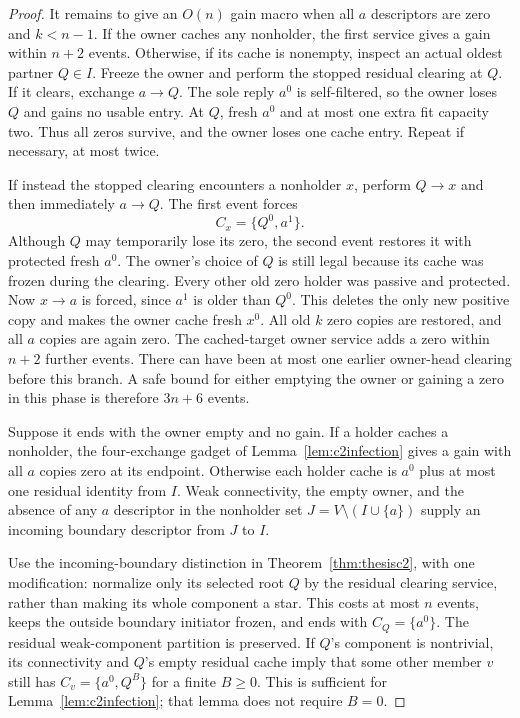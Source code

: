 \documentclass[11pt]{article}
\begin{document}
\begin{proof}
It remains to give an $O(n)$ gain macro when all $a$
descriptors are zero and $k<n-1$. If the owner caches any nonholder, the first service
gives a gain within $n+2$ events. Otherwise, if its cache
is nonempty, inspect an actual oldest partner $Q\in I$.
Freeze the owner and perform the stopped
residual clearing at $Q$. If it clears, exchange
$a\to Q$. The sole reply $a^0$ is self-filtered,
so the owner loses $Q$ and gains no usable entry.
At $Q$, fresh $a^0$ and at most one extra fit capacity
two. Thus all zeros survive, and the owner loses
one cache entry. Repeat if necessary, at most twice.

If instead the stopped clearing encounters a nonholder
$x$, perform $Q\to x$ and then immediately $a\to Q$.
The first event forces
\[
 C_x=\{Q^0,a^1\}.
\]
Although $Q$ may temporarily lose its zero, the second
event restores it with protected fresh $a^0$.
The owner's choice of $Q$ is still legal because
its cache was frozen during the clearing.
Every other old zero holder was passive and protected.
Now $x\to a$ is forced, since $a^1$ is older than $Q^0$.
This deletes the only new positive copy and makes the
owner cache fresh $x^0$. All old $k$ zero copies are
restored, and all $a$ copies are again zero.
The cached-target owner service adds a zero within
$n+2$ further events. There can have been at most one
earlier owner-head clearing before this branch.
A safe bound for either emptying the owner or gaining
a zero in this phase is therefore $3n+6$ events.

Suppose it ends with the owner empty and no gain.
If a holder caches a nonholder, the four-exchange
gadget of Lemma~\ref{lem:c2infection} gives a gain
with all $a$ copies zero at its endpoint.
Otherwise each holder cache is $a^0$ plus at most
one residual identity from $I$. Weak connectivity,
the empty owner, and the absence of any $a$ descriptor
in the nonholder set
$J=V\setminus(I\cup\{a\})$
supply an incoming boundary descriptor from $J$ to $I$.

Use the incoming-boundary distinction in
Theorem~\ref{thm:thesisc2}, with one modification:
normalize only its selected root $Q$ by the residual
clearing service, rather than making its whole component
a star. This costs at most $n$ events, keeps the outside
boundary initiator frozen, and ends with
$C_Q=\{a^0\}$. The residual weak-component partition
is preserved. If $Q$'s component is nontrivial, its
connectivity and $Q$'s empty residual cache imply
that some other member $v$ still has
$C_v=\{a^0,Q^B\}$ for a finite $B\ge0$.
This is sufficient for Lemma~\ref{lem:c2infection};
that lemma does not require $B=0$.


\end{proof}
\end{document}
